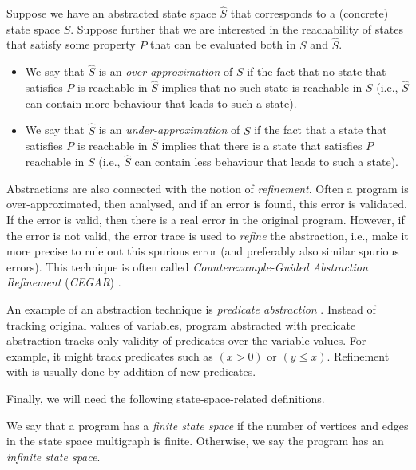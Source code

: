 \begin{definition}
  Suppose we have an abstracted state space $\widehat{S}$ that corresponds to a (concrete) state space $S$.
  Suppose further that we are interested in the reachability of states that satisfy some property $P$ that can be evaluated both in $S$ and $\widehat{S}$.
  \begin{itemize}
    \item We say that $\widehat{S}$ is an \emph{over-approximation} of $S$ if the fact that no state that satisfies $P$ is reachable in $\widehat{S}$ implies that no such state is reachable in $S$ (i.e., $\widehat{S}$ can contain more behaviour that leads to such a state).
    \item We say that $\widehat{S}$ is an \emph{under-approximation} of $S$ if the fact that a state that satisfies $P$ is reachable in $\widehat{S}$ implies that there is a state that satisfies $P$ reachable in $S$ (i.e., $\widehat{S}$ can contain less behaviour that leads to such a state).
    \end{itemize}
\end{definition}

Abstractions are also connected with the notion of \emph{refinement}.
Often a program is over-approximated, then analysed, and if an error is found, this error is validated.
If the error is valid, then there is a real error in the original program.
However, if the error is not valid, the error trace is used to \emph{refine} the abstraction, i.e., make it more precise to rule out this spurious error (and preferably also similar spurious errors).
This technique is often called \emph{Counterexample-Guided Abstraction Refinement} (\emph{CEGAR}) .

An example of an abstraction technique is \emph{predicate abstraction} .
Instead of tracking original values of variables, program abstracted with predicate abstraction tracks only validity of predicates over the variable values.
For example, it might track predicates such as $(x > 0)$ or $(y \le x)$.
Refinement with is usually done by addition of new predicates.

\medskip
Finally, we will need the following state-space-related definitions.

\begin{definition}
We say that a program has a \emph{finite state space} if the number of vertices and edges in the state space multigraph is finite.
Otherwise, we say the program has an \emph{infinite state space}.
\end{definition}

